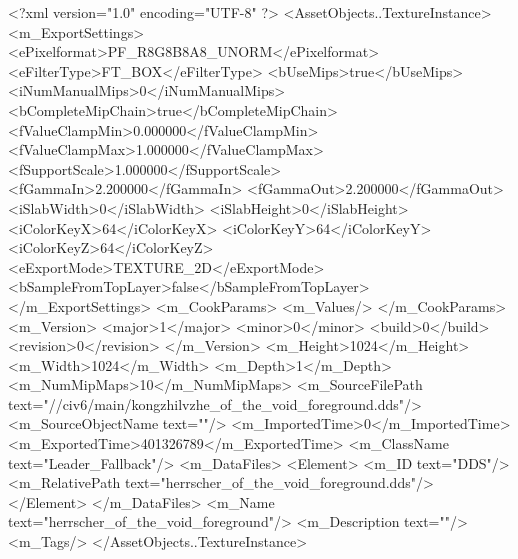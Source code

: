 <?xml version="1.0" encoding="UTF-8" ?>
<AssetObjects..TextureInstance>
	<m_ExportSettings>
		<ePixelformat>PF_R8G8B8A8_UNORM</ePixelformat>
		<eFilterType>FT_BOX</eFilterType>
		<bUseMips>true</bUseMips>
		<iNumManualMips>0</iNumManualMips>
		<bCompleteMipChain>true</bCompleteMipChain>
		<fValueClampMin>0.000000</fValueClampMin>
		<fValueClampMax>1.000000</fValueClampMax>
		<fSupportScale>1.000000</fSupportScale>
		<fGammaIn>2.200000</fGammaIn>
		<fGammaOut>2.200000</fGammaOut>
		<iSlabWidth>0</iSlabWidth>
		<iSlabHeight>0</iSlabHeight>
		<iColorKeyX>64</iColorKeyX>
		<iColorKeyY>64</iColorKeyY>
		<iColorKeyZ>64</iColorKeyZ>
		<eExportMode>TEXTURE_2D</eExportMode>
		<bSampleFromTopLayer>false</bSampleFromTopLayer>
	</m_ExportSettings>
	<m_CookParams>
		<m_Values/>
	</m_CookParams>
	<m_Version>
		<major>1</major>
		<minor>0</minor>
		<build>0</build>
		<revision>0</revision>
	</m_Version>
	<m_Height>1024</m_Height>
	<m_Width>1024</m_Width>
	<m_Depth>1</m_Depth>
	<m_NumMipMaps>10</m_NumMipMaps>
	<m_SourceFilePath text="//civ6/main/kongzhilvzhe\Texture\herrscher_of_the_void_foreground.dds"/>
	<m_SourceObjectName text=""/>
	<m_ImportedTime>0</m_ImportedTime>
	<m_ExportedTime>401326789</m_ExportedTime>
	<m_ClassName text="Leader_Fallback"/>
	<m_DataFiles>
		<Element>
			<m_ID text="DDS"/>
			<m_RelativePath text="herrscher_of_the_void_foreground.dds"/>
		</Element>
	</m_DataFiles>
	<m_Name text="herrscher_of_the_void_foreground"/>
	<m_Description text=""/>
	<m_Tags/>
</AssetObjects..TextureInstance>

